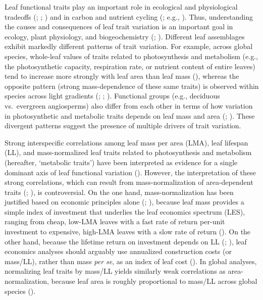 \documentclass[
  12pt,
  letterpaper,
  DIV=11,
  numbers=noendperiod]{scrartcl}
\begin{document}
Leaf functional traits play an important role in ecological and
physiological tradeoffs (;
; ) and in carbon and nutrient cycling
(; e.g.,
). Thus,
understanding the causes and consequences of leaf trait variation is an
important goal in ecology, plant physiology, and biogeochemistry
(;
). Different leaf
assemblages exhibit markedly different patterns of trait variation. For
example, across global species, whole-leaf values of traits related to
photosynthesis and metabolism (e.g., the photosynthetic capacity,
respiration rate, or nutrient content of entire leaves) tend to increase
more strongly with leaf area than leaf mass
(), whereas the opposite
pattern (strong mass-dependence of these same traits) is observed within
species across light gradients (; ;
). Functional groups (e.g.,
deciduous vs.~evergreen angiosperms) also differ from each other in
terms of how variation in photosynthetic and metabolic traits depends on
leaf mass and area (;
). These divergent patterns
suggest the presence of multiple drivers of trait variation.

Strong interspecific correlations among leaf mass per area (LMA), leaf
lifespan (LL), and mass-normalized leaf traits related to photosynthesis
and metabolism (hereafter, `metabolic traits') have been interpreted as
evidence for a single dominant axis of leaf functional variation
(). However, the
interpretation of these strong correlations, which can result from
mass-normalization of area-dependent traits
(;
), is controversial. On the
one hand, mass-normalization has been justified based on economic
principles alone (;
), because leaf mass
provides a simple index of investment that underlies the leaf economics
spectrum (LES), ranging from cheap, low-LMA leaves with a fast rate of
return per-unit investment to expensive, high-LMA leaves with a slow
rate of return (). On the
other hand, because the lifetime return on investment depends on LL
(;
), leaf economics
analyses should arguably use annualized construction costs (or mass/LL),
rather than mass \emph{per se}, as an index of leaf cost
(). In global analyses,
normalizing leaf traits by mass/LL yields similarly weak correlations as
area-normalization, because leaf area is roughly proportional to mass/LL
across global species ().
\end{document}
